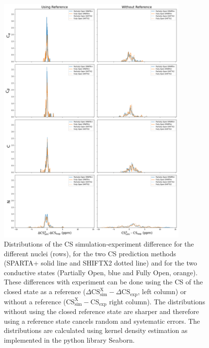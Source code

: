 \documentclass[%
 aip,
 amsmath,amssymb,
 preprint,%
]{revtex4-1}
\begin{document}
\begin{figure}[tbp]
	\includegraphics[width=0.85\textwidth]{figures_SI/error_distribution_print.png}
	 \caption{\scriptsize
Distributions of the CS simulation-experiment difference for the different nuclei (rows), for the two CS prediction methods (SPARTA+ solid line and SHIFTX2 dotted line) and for the two conductive states (Partially Open, blue and Fully Open, orange). These differences with experiment can be done using the CS of the closed state as a reference ($\Delta\text{CS}_{\text{sim}}^{\text{X}}-\Delta\text{CS}_{\text{exp}}$, left column) or without a reference ($\text{CS}_{\text{sim}}^{\text{X}}-\text{CS}_{\text{exp}}$ right column). The distributions without using the closed reference state are sharper and therefore using a reference state cancels random and systematic errors. The distributions are calculated using kernel density estimation as implemented in the python library Seaborn. 
}
\label{SI_error_dist}
\end{figure}
\end{document}
